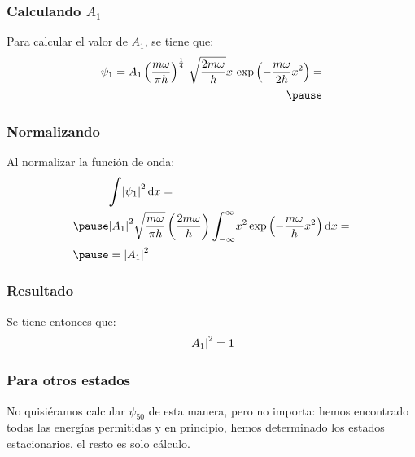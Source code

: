 \documentclass[12pt]{beamer}
\begin{document}
\begin{frame}
\frametitle{Calculando $A_{1}$}
Para calcular el valor de $A_{1}$, se tiene que:
\begin{eqnarray*}
\begin{aligned}
\psi_{1} = A_{1} \left( \dfrac{m \omega}{\pi \hbar} \right)^{\frac{1}{4}} \, \sqrt{\dfrac{2 m \omega}{\hbar}}
 x \, \exp \left( - \dfrac{m \omega}{2 \hbar} x^{2} \right) = \\ \pause
 \end{aligned}
\end{eqnarray*}
\end{frame}
\begin{frame}
\frametitle{Normalizando}
Al normalizar la función de onda:
\pause
\begin{eqnarray*}
\begin{aligned}
&\scaleint{6ex} \abs{\psi_{1}}^{2} \dd{x} = \\ \pause
&\abs{A_{1}}^{2} \sqrt{\dfrac{m \omega}{\pi \hbar}} \left( \dfrac{2 m \omega}{\hbar} \right) \scaleint{6ex}_{\bs -\infty}^{\infty} x^{2} \exp\left( - \dfrac{m \omega}{\hbar} x^{2} \right) \dd{x} = \\ \pause
&= \abs{A_{1}}^{2}
\end{aligned}
\end{eqnarray*}

\end{frame}
\begin{frame}
\frametitle{Resultado}
Se tiene entonces que:
\pause
\begin{align*}
\abs{A_{1}}^{2} = 1
\end{align*}
\end{frame}
\begin{frame}
\frametitle{Para otros estados}
No quisiéramos calcular $\psi_{50}$ de esta manera, \pause pero no importa: hemos encontrado todas las energías permitidas y en principio, hemos determinado los estados estacionarios, el resto es solo cálculo.
\end{frame}
\end{document}
